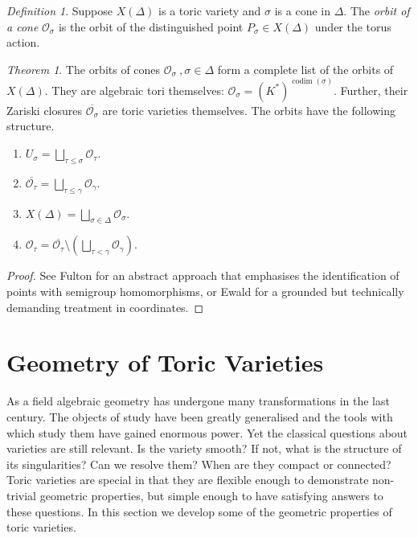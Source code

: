 \documentclass[BSc]{usydthesis}
\numberwithin{equation}{chapter}
\theoremstyle{remark}
\newtheorem{Definition}[equation]{Definition}
\newtheorem{Theorem}[equation]{Theorem}
\begin{document}
\begin{Definition}
 Suppose $X(\Delta)$ is a toric variety and $\sigma$ is a cone in $\Delta.$ The {\em orbit of a cone} $\mathcal{O}_{\sigma}$ is the orbit of the distinguished point $P_{\sigma}\in X(\Delta)$ under the torus action.
\end{Definition}


\begin{Theorem}\label{ToricDecomposition} 
The orbits of cones $\mathcal{O}_{\sigma} \ , \sigma \in \Delta$ form a complete list of the orbits of $X(\Delta).$ They are algebraic tori themselves: $\mathcal{O}_{\sigma} = (K^*)^{\operatorname{codim}(\sigma)}.$ Further, their Zariski closures $\overline{\mathcal{O}_{\sigma}}$ are toric varieties themselves. The orbits have the following structure.
~
\begin{enumerate}
 \item $\displaystyle U_{\sigma}= \bigsqcup_{\tau \leq \sigma} \mathcal{O}_{\tau}.$
 \item $\displaystyle  \overline{\mathcal{O}_{\tau}} = \bigsqcup_{\tau \leq \gamma} \mathcal{O}_{\gamma}.$
 \item $\displaystyle X(\Delta) = \bigsqcup_{\sigma\in \Delta} \mathcal{O}_{\sigma}.$
 \item $\displaystyle  \mathcal{O}_{\tau} =\overline{\mathcal{O}_{\tau}}\setminus \left( \bigsqcup_{\tau < \gamma} \mathcal{O}_{\gamma} \right).$ 
\end{enumerate}

\end{Theorem}

\begin{proof}
 See Fulton \cite[Pages.~ 51-55]{Fulton:Toric} for an abstract approach that emphasises the identification of points with semigroup homomorphisms, or Ewald \cite[Chapters VI, \S 5, Pages.~ 238-242]{Ewald} for a grounded but technically demanding treatment in coordinates.  
\end{proof}




\chapter{Geometry of Toric Varieties}
As a field algebraic geometry has undergone many transformations in the last century. The objects of study have been greatly generalised and the tools with which study them have gained enormous power. Yet the classical questions about varieties are still relevant. Is the variety smooth? If not, what is the structure of its singularities? Can we resolve them? When are they compact or connected? Toric varieties are special in that they are flexible enough to demonstrate non-trivial geometric properties, but simple enough to have satisfying answers to these questions. In this section we develop some of the geometric properties of toric varieties. 
\end{document}
